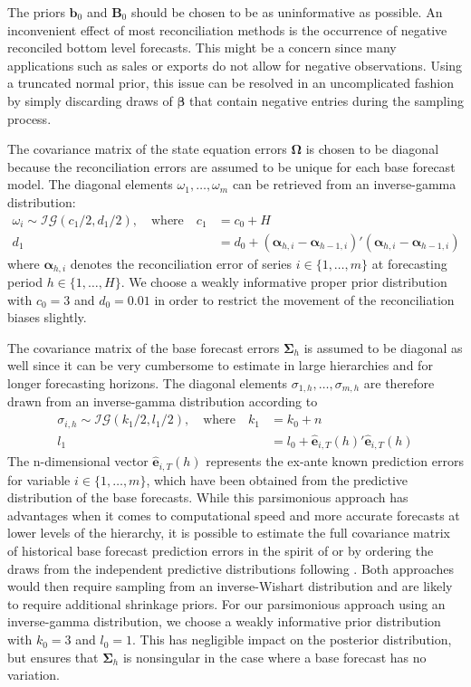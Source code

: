 \documentclass[a4paper,fleqn,11pt]{article}
\begin{document}
The priors $\textbf{b}_0$ and $\textbf{B}_0$ should be chosen to be as uninformative as possible. An inconvenient effect of most reconciliation methods is the occurrence of negative reconciled bottom level forecasts. This might be a concern since many applications such as sales or exports do not allow for negative observations. Using a truncated normal prior, this issue can be resolved in an uncomplicated fashion by simply discarding draws of $\boldsymbol{\beta}$ that contain negative entries during the sampling process.

The covariance matrix of the state equation errors $\boldsymbol{\Omega}$ is chosen to be diagonal because the reconciliation errors are assumed to be unique for each base forecast model. The diagonal elements $\omega_1, \hdots, \omega_m$ can be retrieved from an inverse-gamma distribution:
\begin{align*}
\omega_i \sim \mathcal{IG}(c_1/2,d_1/2), \quad \text{where} \quad c_1 &= c_0 + H\\
	d_1 &= d_0 + (\boldsymbol{\alpha}_{h,i} - \boldsymbol{\alpha}_{h-1,i})'(\boldsymbol{\alpha}_{h,i} - \boldsymbol{\alpha}_{h-1,i})
\end{align*}
where $\boldsymbol{\alpha}_{h,i}$ denotes the reconciliation error of series $i \in \{1, \hdots, m \}$ at forecasting period $h \in \{1, \hdots, H\}$. We choose a weakly informative proper prior distribution with $c_0 = 3$ and $d_0 = 0.01$ in order to restrict the movement of the reconciliation biases slightly. 

The covariance matrix of the base forecast errors $\boldsymbol{\Sigma}_h$ is assumed to be diagonal as well since it can be very cumbersome to estimate in large hierarchies and for longer forecasting horizons. The diagonal elements $\sigma_{1,h}, \hdots, \sigma_{m,h}$ are therefore drawn from an inverse-gamma distribution according to
\begin{align*}
	\sigma_{i,h} \sim \mathcal{IG}(k_1/2,l_1/2), \quad \text{where} \quad k_1 &= k_0 + n\\
	l_1 &= l_0 + \mathbf{\hat{e}}_{i,T}(h)'\mathbf{\hat{e}}_{i,T}(h)
\end{align*}
The n-dimensional vector $\mathbf{\hat{e}}_{i,T}(h)$ represents the ex-ante known prediction errors for variable $i \in \{1, \hdots, m\}$, which have been obtained from the predictive distribution of the base forecasts. While this parsimonious approach has advantages when it comes to computational speed and more accurate forecasts at lower levels of the hierarchy, it is possible to estimate the full covariance matrix of historical base forecast prediction errors in the spirit of \cite{Wickramasuriya2015} or by ordering the draws from the independent predictive distributions following \cite{Jeon2018}. Both approaches would then require sampling from an inverse-Wishart distribution and are likely to require additional shrinkage priors. For our parsimonious approach using an inverse-gamma distribution, we choose a weakly informative prior distribution with $k_0 = 3$ and $l_0 = 1$. This has negligible impact on the posterior
distribution, but ensures that $\boldsymbol{\Sigma}_h$ is nonsingular in the case where a base forecast has no
variation.
\end{document}
